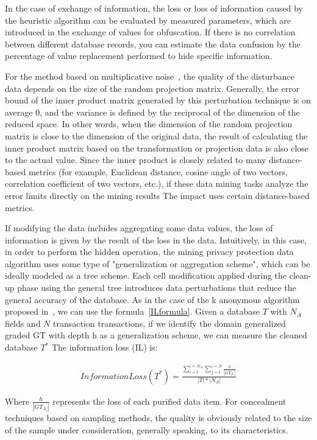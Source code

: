 \documentclass[journal,transmag]{IEEEtran}
\begin{document}
In the case of exchange of information, the loss or loss of information caused by the heuristic algorithm can be evaluated by measured parameters, which are introduced in the exchange of values for obfuscation. If there is no correlation between different database records, you can estimate the data confusion by the percentage of value replacement performed to hide specific information.

For the method based on multiplicative noise~\cite{liu2006random}, the quality of the disturbance data depends on the size of the random projection matrix. Generally, the error bound of the inner product matrix generated by this perturbation technique is on average 0, and the variance is defined by the reciprocal of the dimension of the reduced space. In other words, when the dimension of the random projection matrix is close to the dimension of the original data, the result of calculating the inner product matrix based on the transformation or projection data is also close to the actual value. Since the inner product is closely related to many distance-based metrics (for example, Euclidean distance, cosine angle of two vectors, correlation coefficient of two vectors, etc.), if these data mining tasks analyze the error limits directly on the mining results The impact uses certain distance-based metrics.

If modifying the data includes aggregating some data values, the loss of information is given by the result of the loss in the data. Intuitively, in this case, in order to perform the hidden operation, the mining privacy protection data algorithm uses some type of "generalization or aggregation scheme", which can be ideally modeled as a tree scheme. Each cell modification applied during the clean-up phase using the general tree introduces data perturbations that reduce the general accuracy of the database. As in the case of the k anonymous algorithm proposed in~\cite{sweeney2002achieving}, we can use the formula~\ref{ILformula}. Given a database $ T $ with $ N_A $ fields and $ N $ transaction transactions, if we identify the domain generalized graded GT with depth h as a generalization scheme, we can measure the cleaned database $T^*$ The information loss (IL) is:


\begin{eqnarray}\label{ILformula}
InformationLoss(T^*)=\frac{\sum^{i=N_A}_{i=l} \sum^{i=N}_{j=l} \frac{h}{|GT_{A_i}|} }{|T|*|N_A|}
\end{eqnarray}

Where $\frac{h}{|GT_{A_i}|}$ represents the loss of each purified data item. For concealment techniques based on sampling methods, the quality is obviously related to the size of the sample under consideration, generally speaking, to its characteristics.
\end{document}
